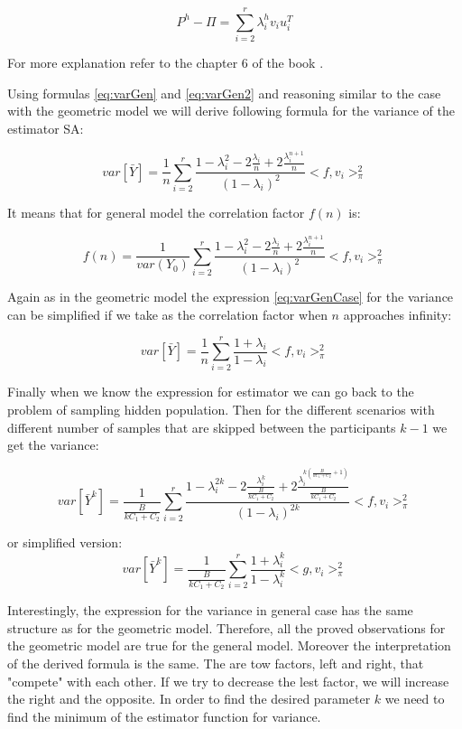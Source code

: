 \documentclass[12pt]{report}
\begin{document}
\begin{equation}\label{eq:varGen2}
P^h - \Pi = \sum_{i = 2}^r \lambda_i^h v_i u_i^T
\end{equation}

For more explanation refer to the chapter 6 of the book \cite{bremaud2013markov}.


Using formulas \ref{eq:varGen} and \ref{eq:varGen2} and reasoning similar to the case with the geometric model we will derive following formula for the variance of the estimator SA:

\begin{equation}
\label{eq:varGenCase}
 var\left[\bar{Y} \right] = \frac{1}{n} \sum_{i=2}^r\frac{1-\lambda_i^2 - 2\frac{\lambda_i}{n} + 2\frac{\lambda_i^{n+1}}{n}}{(1 - \lambda_i)^2} <f, v_i>^2_{\pi}
\end{equation}

It means that for general model the correlation factor $f(n)$ is:

$$ f(n) = \frac{1}{var(Y_0)} \sum_{i=2}^r\frac{1-\lambda_i^2 - 2\frac{\lambda_i}{n} + 2\frac{\lambda_i^{n+1}}{n}}{(1 - \lambda_i)^2} <f, v_i>^2_{\pi}$$

Again as in the geometric model the expression \ref{eq:varGenCase} for the variance can be simplified if we take as the correlation factor when $n$ approaches infinity:

$$ var\left[\bar{Y} \right] = \frac{1}{n} \sum_{i=2}^r\frac{1 + \lambda_i}{1 - \lambda_i} <f, v_i>^2_{\pi}$$

Finally when we know the expression for estimator we can go back to the problem of sampling hidden population. Then for the different scenarios with different number of samples that are skipped between the participants $k - 1$ we get the variance: 


\begin{equation}
\label{eq:genVarSkip}
var\left[\bar{Y}^k \right] =  \frac{1}{\frac{B}{kC_1 + C_2}} \sum_{i=2}^r\frac{1-\lambda_i^{2k} - 2\frac{\lambda_i^k}{\frac{B}{kC_1 + C_2}} + 2\frac{\lambda_i^{k\left(\frac{B}{kC_1 + C_2}+1\right)}}{\frac{B}{kC_1 + C_2}}}{(1 - \lambda_i)^{2k}} <f, v_i>^2_{\pi}
\end{equation}


or simplified version:
$$ var\left[\bar{Y}^k \right] = \frac{1}{\frac{B}{kC_1 + C_2}} \sum_{i=2}^r\frac{1 + \lambda_i^k}{1 - \lambda_i^k} <g, v_i>^2_{\pi}$$

Interestingly, the expression for the variance in general case has the same structure as for the geometric model. Therefore, all the proved observations for the geometric model are true for the general model. Moreover the interpretation of the derived formula is the same. The are tow factors, left and right, that "compete" with each other. If we try to decrease the lest factor, we will increase the right and the opposite. In order to find the desired parameter $k$ we need to find the minimum of the estimator function for variance. 
\end{document}
